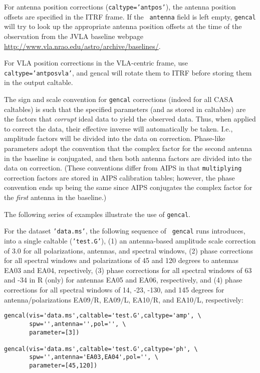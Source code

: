 {For antenna position corrections ({\tt caltype='antpos'}), the antenna
position offsets are specified in the ITRF frame.  If the {\tt
  antenna} field is left empty, {\tt gencal} will try to look up the
appropriate antenna position offsets at the time of the observation
from the JVLA baseline webpage
\url{http://www.vla.nrao.edu/astro/archive/baselines/}.

For VLA position corrections in the VLA-centric frame, use {\tt
  caltype='antposvla'}, and gencal will rotate them to ITRF before
storing them in the output caltable.

The sign and scale convention for {\tt gencal} corrections (indeed for
all CASA caltables) is such that the specified parameters (and as
stored in caltables) are the factors that {\em corrupt} ideal data to
yield the observed data.  Thus, when applied to correct the data,
their effective inverse will automatically be taken.  I.e., amplitude
factors will be divided into the data on correction.  Phase-like
parameters adopt the convention that the complex factor for the second
antenna in the baseline is conjugated, and then both antenna factors
are divided into the data on correction.  (These conventions differ
from AIPS in that {\tt multiplying} correction factors are stored in
AIPS calibration tables; however, the phase convention ends up being
the same since AIPS conjugates the complex factor for the {\em first}
antenna in the baseline.)

The following series of examples illustrate the use of {\tt gencal}.

For the dataset {\tt 'data.ms'}, the following sequence of {\tt
gencal} runs introduces, into a single caltable ({\tt 'test.G'}), (1)
an antenna-based amplitude scale correction of $3.0$ for all
polarizations, antennas, and spectral windows, (2) phase corrections
for all spectral windows and polarizations of 45 and 120 degrees to
antennas EA03 and EA04, repectively, (3) phase corrections for all
spectral windows of 63 and -34 in R (only) for antennas EA05 and EA06,
respectively, and (4) phase corrections for all spectral windows of
14, -23, -130, and 145 degrees for antenna/polarizations EA09/R,
EA09/L, EA10/R, and EA10/L, respectively:

\small
\begin{verbatim}
gencal(vis='data.ms',caltable='test.G',caltype='amp', \
       spw='',antenna='',pol='', \
       parameter=[3])

gencal(vis='data.ms',caltable='test.G',caltype='ph', \
       spw='',antenna='EA03,EA04',pol='', \
       parameter=[45,120])


\end{verbatim}}
